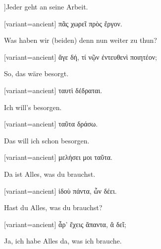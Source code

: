 ]Jeder geht an seine Arbeit.

\switchcolumn

\begin{greek}[variant=ancient]%
πᾶς χωρεῖ πρὸς ἔργον.

\end{greek}%
\switchcolumn*

Was haben wir (beiden) denn nun weiter zu thun?

\switchcolumn

\begin{greek}[variant=ancient]%
ἄγε δή, τί νῷν ἐντευθενὶ ποιητέον;

\end{greek}%
\switchcolumn*

So, das wäre besorgt.

\switchcolumn

\begin{greek}[variant=ancient]%
ταυτὶ δέδραται.

\end{greek}%
\switchcolumn*

Ich will's besorgen.

\switchcolumn

\begin{greek}[variant=ancient]%
ταῦτα δράσω.

\end{greek}%
\switchcolumn*

Das will ich schon besorgen.

\switchcolumn

\begin{greek}[variant=ancient]%
μελήσει μοι ταῦτα.

\end{greek}%
\switchcolumn*

Da ist Alles, was du brauchst.

\switchcolumn

\begin{greek}[variant=ancient]%
ἰδοὺ πάντα, ὧν δέει.

\end{greek}%
\switchcolumn*

Hast du Alles, was du brauchst?

\switchcolumn

\begin{greek}[variant=ancient]%
ἆρ' ἔχεις ἅπαντα, ἅ δεῖ;

\end{greek}%
\switchcolumn*

Ja, ich habe Alles da, was ich brauche.

